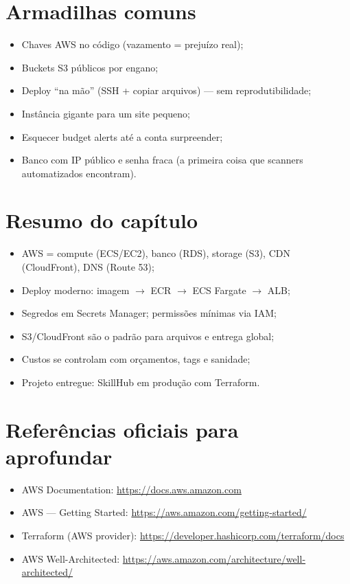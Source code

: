 \section{Armadilhas comuns}

\begin{itemize}[leftmargin=*, itemsep=0.4em]
  \item Chaves AWS no código (vazamento = prejuízo real);
  \item Buckets S3 públicos por engano;
  \item Deploy ``na mão'' (SSH + copiar arquivos) — sem reprodutibilidade;
  \item Instância gigante para um site pequeno;
  \item Esquecer budget alerts até a conta surpreender;
  \item Banco com IP público e senha fraca (a primeira coisa que scanners automatizados encontram).
\end{itemize}

\section{Resumo do capítulo}

\begin{itemize}[leftmargin=*, itemsep=0.3em]
  \item AWS = compute (ECS/EC2), banco (RDS), storage (S3), CDN (CloudFront), DNS (Route 53);
  \item Deploy moderno: imagem $\rightarrow$ ECR $\rightarrow$ ECS Fargate $\rightarrow$ ALB;
  \item Segredos em Secrets Manager; permissões mínimas via IAM;
  \item S3/CloudFront são o padrão para arquivos e entrega global;
  \item Custos se controlam com orçamentos, tags e sanidade;
  \item Projeto entregue: SkillHub em produção com Terraform.
\end{itemize}

\section{Referências oficiais para aprofundar}

\begin{itemize}[leftmargin=*, itemsep=0.3em]
  \item AWS Documentation: \url{https://docs.aws.amazon.com}
  \item AWS — Getting Started: \url{https://aws.amazon.com/getting-started/}
  \item Terraform (AWS provider): \url{https://developer.hashicorp.com/terraform/docs}
  \item AWS Well-Architected: \url{https://aws.amazon.com/architecture/well-architected/}
\end{itemize}
